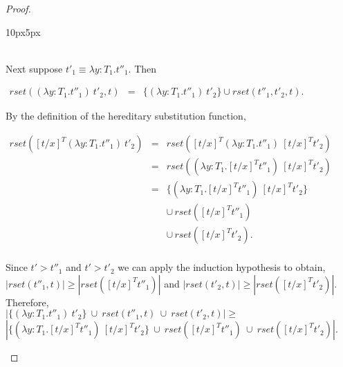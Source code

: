 \begin{proof}
\begin{changemargin}{10px}{5px}
\begin{itemize}
  \ \\
  Next suppose $t'_1 \equiv \lambda y:T_1.t''_1$.  Then 
  \begin{center}
    \begin{math}
      \begin{array}{lll}
        rset((\lambda y:T_1.t''_1)\ t'_2, t) & = & \{ (\lambda y:T_1.t''_1)\ t'_2\} \cup rset(t''_1, t'_2, t).
      \end{array}
    \end{math}
  \end{center}
  By the definition of the hereditary substitution function,
  \begin{center}
    \begin{math}
      \begin{array}{lll}
        rset([t/x]^T (\lambda y:T_1.t''_1)\ t'_2) & = & rset([t/x]^T (\lambda y:T_1.t''_1)\ [t/x]^T t'_2)\\
        & = & rset((\lambda y:T_1.[t/x]^T t''_1)\ [t/x]^T t'_2)\\
        & = & \{(\lambda y:T_1.[t/x]^T t''_1)\ [t/x]^T t'_2\} \\
        &   & \cup\,rset([t/x]^T t''_1) \\
        &   & \cup\,rset([t/x]^T t'_2).\\
        
      \end{array}
    \end{math}
  \end{center}
  Since $t' > t''_1$ and $t' > t'_2$ we can apply the induction hypothesis to obtain,
  $|rset(t''_1, t)| \geq |rset([t/x]^T t''_1)|$ and $|rset(t'_2,t)| \geq |rset([t/x]^T t'_2)|$.  Therefore, \\
  $|\{ (\lambda y:T_1.t''_1)\ t'_2\}\ \cup\ rset(t''_1,t)\ \cup\ rset(t'_2,t)| \geq $ 
  $|\{(\lambda y:T_1.[t/x]^T t''_1)\ [t/x]^T t'_2\}\ \cup\ rset([t/x]^T t''_1)\ \cup\ rset([t/x]^T t'_2)|$.
  

\end{itemize}
\end{changemargin}
\end{proof}
